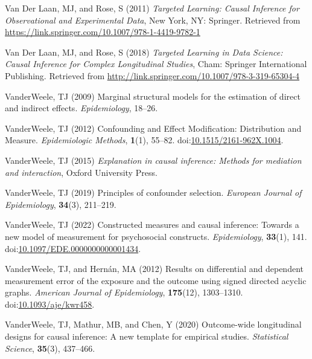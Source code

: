 \documentclass[
  single column]{article}
\newlength{\cslhangindent}
\newenvironment{CSLReferences}[2] %
 {\begin{list}{}{%
  \setlength{\itemindent}{0pt}
  \setlength{\leftmargin}{0pt}
  \setlength{\parsep}{0pt}
  \ifodd #1
   \setlength{\leftmargin}{\cslhangindent}
   \setlength{\itemindent}{-1\cslhangindent}
  \fi
  \setlength{\itemsep}{#2\baselineskip}}}
 {\end{list}}
\begin{document}
\begin{CSLReferences}{1}{0}
Van Der Laan, MJ, and Rose, S (2011) \emph{Targeted Learning: Causal
Inference for Observational and Experimental Data}, New York, NY:
Springer. Retrieved from
\url{https://link.springer.com/10.1007/978-1-4419-9782-1}

Van Der Laan, MJ, and Rose, S (2018) \emph{Targeted Learning in Data
Science: Causal Inference for Complex Longitudinal Studies}, Cham:
Springer International Publishing. Retrieved from
\url{http://link.springer.com/10.1007/978-3-319-65304-4}

VanderWeele, TJ (2009) Marginal structural models for the estimation of
direct and indirect effects. \emph{Epidemiology}, 18--26.

VanderWeele, TJ (2012) Confounding and Effect Modification: Distribution
and Measure. \emph{Epidemiologic Methods}, \textbf{1}(1), 55--82.
doi:\href{https://doi.org/10.1515/2161-962X.1004}{10.1515/2161-962X.1004}.

VanderWeele, TJ (2015) \emph{Explanation in causal inference: Methods
for mediation and interaction}, Oxford University Press.

VanderWeele, TJ (2019) Principles of confounder selection.
\emph{European Journal of Epidemiology}, \textbf{34}(3), 211--219.

VanderWeele, TJ (2022) Constructed measures and causal inference:
Towards a new model of measurement for psychosocial constructs.
\emph{Epidemiology}, \textbf{33}(1), 141.
doi:\href{https://doi.org/10.1097/EDE.0000000000001434}{10.1097/EDE.0000000000001434}.

VanderWeele, TJ, and Hernán, MA (2012) Results on differential and
dependent measurement error of the exposure and the outcome using signed
directed acyclic graphs. \emph{American Journal of Epidemiology},
\textbf{175}(12), 1303--1310.
doi:\href{https://doi.org/10.1093/aje/kwr458}{10.1093/aje/kwr458}.

VanderWeele, TJ, Mathur, MB, and Chen, Y (2020) Outcome-wide
longitudinal designs for causal inference: A new template for empirical
studies. \emph{Statistical Science}, \textbf{35}(3), 437--466.


\end{CSLReferences}
\end{document}
